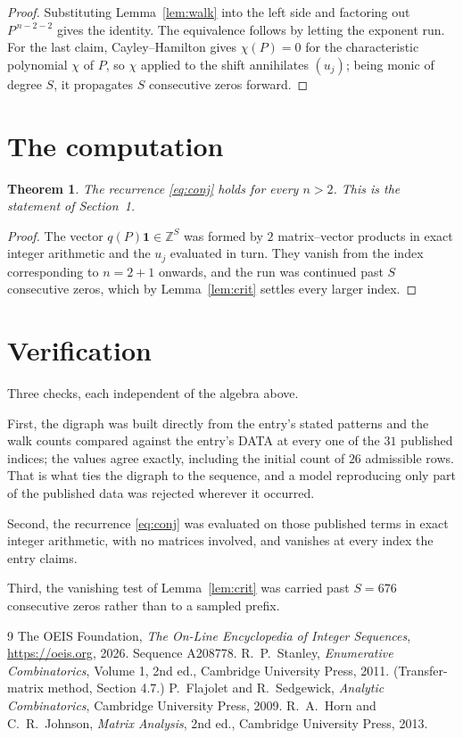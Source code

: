\documentclass[11pt,a4paper]{article}
\theoremstyle{plain}
\newtheorem{theorem}{Theorem}
\theoremstyle{definition}
\begin{document}
\begin{proof}
Substituting Lemma~\ref{lem:walk} into the left side and factoring out
$P^{\,n-2-2}$ gives the identity. The equivalence follows by letting the exponent
run. For the last claim, Cayley--Hamilton gives $\chi(P)=0$ for the characteristic
polynomial $\chi$ of $P$, so $\chi$ applied to the shift annihilates $(u_j)$; being monic of
degree $S$, it propagates $S$ consecutive zeros forward.
\end{proof}

\section{The computation}

\begin{theorem}
The recurrence \eqref{eq:conj} holds for every $n>2$. This is the statement of
Section~1.
\end{theorem}

\begin{proof}
The vector $q(P)\mathbf{1}\in\mathbb{Z}^{S}$ was formed by $2$ matrix--vector
products in exact integer arithmetic and the $u_j$ evaluated in turn. They vanish from the
index corresponding to $n=2+1$ onwards, and the run was continued past $S$ consecutive
zeros, which by Lemma~\ref{lem:crit} settles every larger index.
\end{proof}

\section{Verification}

Three checks, each independent of the algebra above.

First, the digraph was built directly from the entry's stated patterns and the walk counts
compared against the entry's DATA at every one of the $31$ published indices; the
values agree exactly, including the initial count of $26$ admissible rows. That is
what ties the digraph to the sequence, and a model reproducing only part of the published
data was rejected wherever it occurred.

Second, the recurrence \eqref{eq:conj} was evaluated on those published terms in exact
integer arithmetic, with no matrices involved, and vanishes at every index the entry claims.

Third, the vanishing test of Lemma~\ref{lem:crit} was carried past $S=676$ consecutive
zeros rather than to a sampled prefix.

\begin{thebibliography}{9}
 The OEIS Foundation, \emph{The On-Line Encyclopedia of Integer
Sequences}, \url{https://oeis.org}, 2026. Sequence A208778.
 R.~P.~Stanley, \emph{Enumerative Combinatorics}, Volume 1, 2nd ed.,
Cambridge University Press, 2011. (Transfer-matrix method, Section 4.7.)
 P.~Flajolet and R.~Sedgewick, \emph{Analytic Combinatorics}, Cambridge
University Press, 2009.
 R.~A.~Horn and C.~R.~Johnson, \emph{Matrix Analysis}, 2nd ed., Cambridge
University Press, 2013.
\end{thebibliography}
\end{document}
